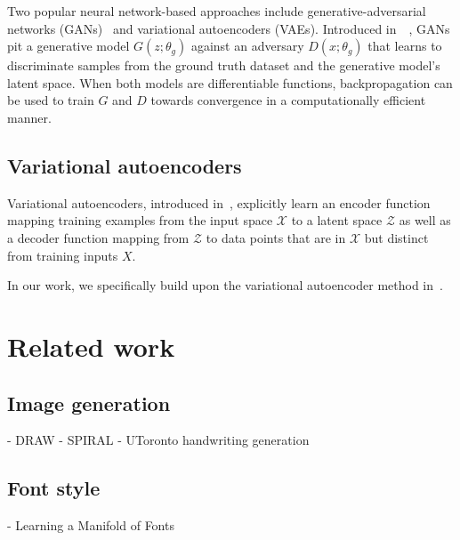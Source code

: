 Two popular neural network-based approaches include generative-adversarial networks (GANs)~\cite{karpathy2016generative} and variational autoencoders (VAEs).
Introduced in~\citeyear{goodfellow2014generative}~\cite{goodfellow2014generative}, GANs pit a generative model $G(z; \theta_g)$ against an adversary $D(x; \theta_g)$ that learns to discriminate samples from the ground truth dataset and the generative model's latent space.
When both models are differentiable functions, backpropagation can be used to train $G$ and $D$ towards convergence in a computationally efficient manner.

\subsection{Variational autoencoders}
Variational autoencoders, introduced in~\cite{kingma2013auto}, explicitly learn an encoder function mapping training examples from the input space $\mathcal{X}$ to a latent space $\mathcal{Z}$ as well as a decoder function mapping from $\mathcal{Z}$ to data points that are in $\mathcal{X}$ but distinct from training inputs $X$.

In our work, we specifically build upon the variational autoencoder method in~\cite{ha2017neural}.

\section{Related work}
\subsection{Image generation}
- DRAW
- SPIRAL
- UToronto handwriting generation
\subsection{Font style}
- Learning a Manifold of Fonts
